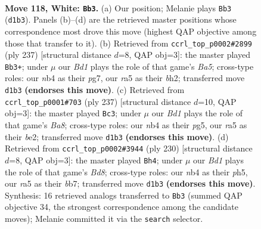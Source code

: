 \documentclass[11pt]{article}
\begin{document}
\clearpage

\begin{figure}[p]\centering
\begin{subfigure}{0.46\textwidth}\centering
\resizebox{\linewidth}{!}{%
\newchessgame
\chessboard[
  setfen={8/8/6k1/r5p1/1n6/6K1/8/3B4 w - - 20 118},
  showmover=false,
  pgfstyle=straightmove, color=movearrow, markmove={d1-b3}
]}
\caption{}
\end{subfigure}\hfill
\begin{subfigure}{0.46\textwidth}\centering
\resizebox{\linewidth}{!}{%
\newchessgame
\chessboard[
  setfen={3k4/6P1/3P4/3K4/b7/8/7B/8 b - - 22 119},
  showmover=false,
  pgfstyle=straightmove, color=movearrow, markmove={a4-b3}
]}
\caption{}
\end{subfigure}
\\[4pt]
\begin{subfigure}{0.46\textwidth}\centering
\resizebox{\linewidth}{!}{%
\newchessgame
\chessboard[
  setfen={8/5k2/8/5PP1/5K2/8/4B3/b7 b - - 88 119},
  showmover=false,
  pgfstyle=straightmove, color=movearrow, markmove={a1-c3}
]}
\caption{}
\end{subfigure}\hfill
\begin{subfigure}{0.46\textwidth}\centering
\resizebox{\linewidth}{!}{%
\newchessgame
\chessboard[
  setfen={3B4/1b6/8/5k1p/5p2/8/5K2/8 w - - 78 116},
  showmover=false,
  pgfstyle=straightmove, color=movearrow, markmove={d8-h4}
]}
\caption{}
\end{subfigure}
\caption{\textbf{Move 118, White: \texttt{Bb3}.} (a) Our position; Melanie plays \texttt{Bb3} (\texttt{d1b3}). Panels (b)--(d) are the retrieved master positions whose correspondence most drove this move (highest QAP objective among those that transfer to it). (b) Retrieved from \texttt{ccrl\_top\_p0002\#2899} (ply 237) [structural distance $d$=8, QAP obj=3]: the master played \texttt{Bb3+}; under $\mu$ our \emph{Bd1} plays the role of that game's \emph{Ba5}; cross-type roles: our \emph{n}b4 as their \emph{p}g7, our \emph{r}a5 as their \emph{b}h2; transferred move \texttt{d1b3} \textbf{(endorses this move)}. (c) Retrieved from \texttt{ccrl\_top\_p0001\#703} (ply 237) [structural distance $d$=10, QAP obj=3]: the master played \texttt{Bc3}; under $\mu$ our \emph{Bd1} plays the role of that game's \emph{Ba8}; cross-type roles: our \emph{n}b4 as their \emph{p}g5, our \emph{r}a5 as their \emph{b}e2; transferred move \texttt{d1b3} \textbf{(endorses this move)}. (d) Retrieved from \texttt{ccrl\_top\_p0002\#3944} (ply 230) [structural distance $d$=8, QAP obj=3]: the master played \texttt{Bh4}; under $\mu$ our \emph{Bd1} plays the role of that game's \emph{Bd8}; cross-type roles: our \emph{n}b4 as their \emph{p}h5, our \emph{r}a5 as their \emph{b}b7; transferred move \texttt{d1b3} \textbf{(endorses this move)}. Synthesis: 16 retrieved analogs transferred to \texttt{Bb3} (summed QAP objective 34, the strongest correspondence among the candidate moves); Melanie committed it via the \texttt{search} selector.}
\label{fig:thought-m234}
\end{figure}
\end{document}
